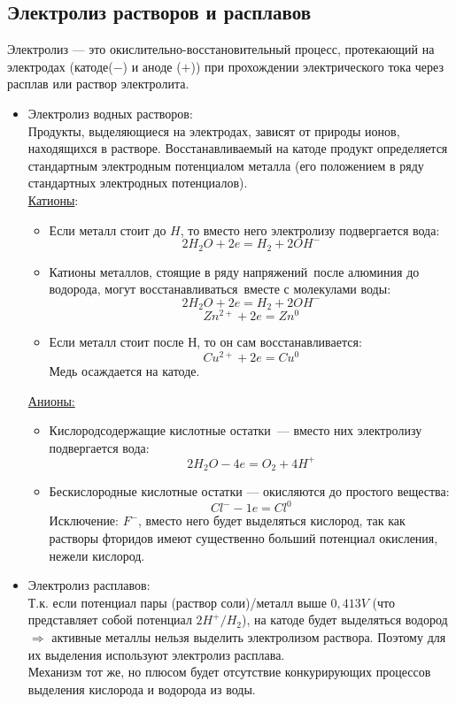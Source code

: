 \documentclass[14pt,a4paper]{scrartcl}
\begin{document}
\subsection*{Электролиз растворов и расплавов}
Электролиз — это окислительно-восстановительный процесс, протекающий на электродах (катоде($-$) и аноде ($+$))
при прохождении электрического тока через расплав или раствор электролита. \\
\begin{itemize}
	\item Электролиз водных растворов: \\
	Продукты, выделяющиеся на электродах, зависят от
	природы ионов, находящихся в растворе. Восстанавливаемый на катоде продукт
	определяется стандартным электродным потенциалом металла (его положением в
	ряду стандартных электродных потенциалов). \\
	\ul{Катионы}: \\
	\begin{itemize}
		\item Если металл стоит до $H$, то вместо него электролизу подвергается вода:
		$$ 2H_2O + 2e = H_2 + 2OH^- $$
		\item Катионы металлов, стоящие в ряду напряжений после алюминия до водорода, могут восстанавливаться вместе с молекулами воды:
		$$ 2H_2O + 2e = H_2 + 2OH^- $$
		$$ Zn^{2+} + 2e = Zn^0 $$
		\item Если металл стоит после Н, то он сам восстанавливается:
		$$ Cu^{2+} + 2e = Cu^0 $$
		Медь осаждается на катоде.
	\end{itemize}
	\ul{Анионы:} \\
	\begin{itemize}
		\item Кислородсодержащие кислотные остатки — вместо них электролизу подвергается вода:
		$$ 2H_2O - 4e = O_2 + 4H^+ $$ 
		\item Бескислородные кислотные остатки — окисляются до простого вещества:
		$$ Cl^- - 1e = Cl^0 $$
		Исключение: $F^-$, вместо него будет выделяться кислород, так как растворы фторидов имеют существенно больший потенциал окисления, нежели кислород.
	\end{itemize}
	\item Электролиз расплавов:\\
	Т.к. если потенциал пары (раствор соли)/металл выше $0,413V$ (что представляет собой потенциал $2H^+/H_2 $), на катоде будет выделяться водород $\Rightarrow$ активные металлы нельзя выделить электролизом раствора. Поэтому для их выделения используют электролиз расплава. \\
	Механизм тот же, но плюсом будет отсутствие конкурирующих процессов выделения кислорода и водорода из воды.
\end{itemize}
\end{document}
